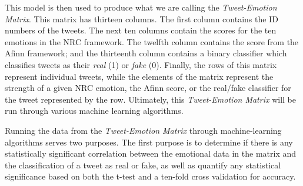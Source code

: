 \documentclass{article}[12pt]
\numberwithin{equation}{subsection}
\begin{document}
\begin{flushleft}
This model is then used to produce what we are calling the \emph{Tweet-Emotion Matrix}.  This matrix has thirteen columns.  The first column contains the ID numbers of the tweets.  The next ten columns contain the scores for the ten emotions in the NRC framework.  The twelfth column contains the score from the Afinn framework; and the thirteenth column contains a binary classifier which classifies tweets as their \emph{real} (1) or \emph{fake} (0). Finally, the rows of this matrix represent individual tweets, while the elements of the matrix represent the strength of a given NRC emotion, the Afinn score, or the real/fake classifier for the tweet represented by the row.  Ultimately, this \emph{Tweet-Emotion Matrix} will be run through various machine learning algorithms. \newline

Running the data from the \emph{Tweet-Emotion Matrix} through machine-learning algorithms serves two purposes.  The first purpose is to determine if there is any statistically significant correlation between the emotional data in the matrix and the classification of a tweet as real or fake, as well as quantify any statistical significance based on both the t-test and a ten-fold cross validation for accuracy.  






























































\end{flushleft}
\end{document}
